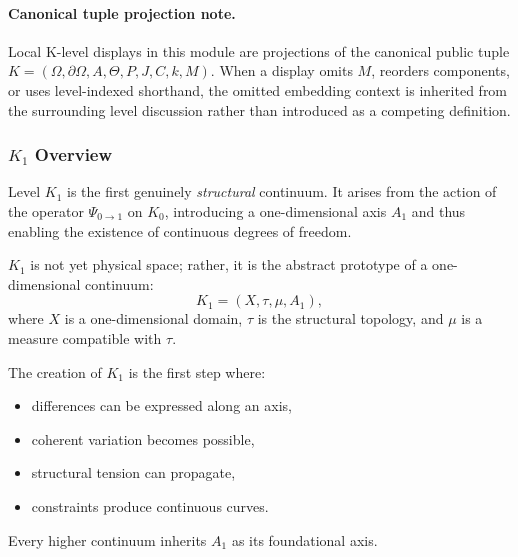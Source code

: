 



\paragraph{Canonical tuple projection note.}
Local K-level displays in this module are projections of the canonical public tuple \(K=(\Omega,\partial\Omega,A,\Theta,P,J,C,k,M)\). When a display omits \(M\), reorders components, or uses level-indexed shorthand, the omitted embedding context is inherited from the surrounding level discussion rather than introduced as a competing definition.

\subsubsection{\texorpdfstring{$K_1$}{K_1} Overview}
\label{sec:k1-overview}

Level $K_1$ is the first genuinely \emph{structural} continuum.
It arises from the action of the operator $\Psi_{0\to1}$ on $K_0$,
introducing a one-dimensional axis $A_1$ and thus enabling the existence
of continuous degrees of freedom.

$K_1$ is not yet physical space; rather, it is the abstract prototype of
a one-dimensional continuum:
\[
K_1 = (X, \tau, \mu, A_1),
\]
where $X$ is a one-dimensional domain, $\tau$ is the structural
topology, and $\mu$ is a measure compatible with $\tau$.

The creation of $K_1$ is the first step where:
\begin{itemize}
    \item differences can be expressed along an axis,
    \item coherent variation becomes possible,
    \item structural tension can propagate,
    \item constraints produce continuous curves.
\end{itemize}

Every higher continuum inherits $A_1$ as its foundational axis.

